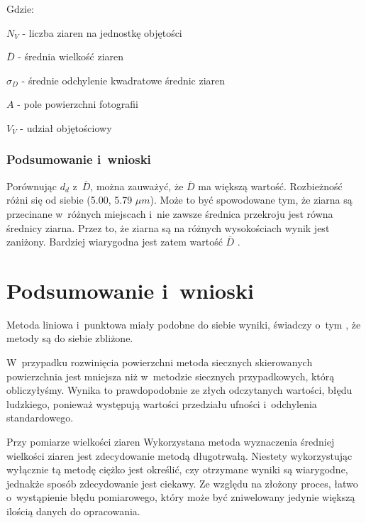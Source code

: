 \documentclass[a4paper,12pt]{article}
\begin{document}
Gdzie:

$N_V$ - liczba ziaren na jednostkę objętości

$\overline{D}$ - średnia wielkość ziaren

$\sigma_D$ - średnie odchylenie kwadratowe średnic ziaren

$A$ - pole powierzchni fotografii

$V_V$ - udział objętościowy
\newpage

{\color{purple}
\subsubsection{Podsumowanie i~wnioski}

Porównując $d_d$ z~$\overline{D}$, można zauważyć, że $\overline{D}$ ma większą wartość. Rozbieżność różni się od siebie (5.00, 5.79 $\mu m$). Może to być spowodowane tym, że ziarna są  przecinane w~różnych miejscach i~nie zawsze średnica przekroju jest równa średnicy ziarna. Przez to, że ziarna są na różnych wysokościach wynik jest zaniżony. Bardziej wiarygodna jest zatem wartość $\overline{D}$ .}

\section{Podsumowanie i~wnioski}

{\color{purple}
Metoda liniowa i~punktowa miały podobne do siebie wyniki, świadczy o~tym , że metody są do siebie zbliżone.

W~przypadku rozwinięcia powierzchni metoda siecznych skierowanych powierzchnia jest mniejsza niż w~metodzie siecznych przypadkowych, którą obliczyłyśmy. Wynika to prawdopodobnie ze złych odczytanych wartości, błędu ludzkiego, ponieważ występują  wartości przedziału ufności i~odchylenia standardowego.

Przy pomiarze wielkości ziaren Wykorzystana metoda wyznaczenia średniej wielkości ziaren jest zdecydowanie metodą długotrwałą. Niestety wykorzystując wyłącznie tą metodę ciężko jest określić, czy otrzymane
wyniki są wiarygodne, jednakże sposób zdecydowanie jest ciekawy. Ze względu na złożony proces, łatwo o~wystąpienie błędu pomiarowego, który może być zniwelowany jedynie większą ilością danych do opracowania. }
\end{document}
